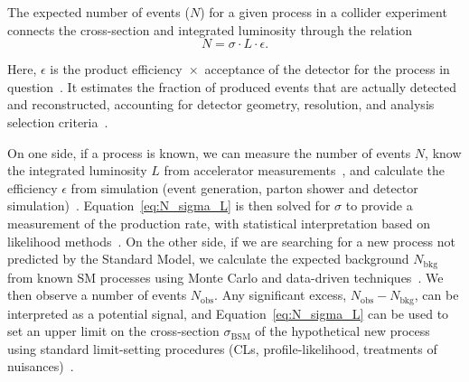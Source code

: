 The expected number of events ($N$) for a given process in a collider experiment connects the cross-section and integrated luminosity through the relation
\begin{equation}
N = \sigma \cdot L \cdot \epsilon.
\label{eq:N_sigma_L}
\end{equation}

Here, $\epsilon$ is the product efficiency~$\times$~acceptance of the detector for the process in question~\cite{CMS:PF2017,deFavereau:2013fsa}. It estimates the fraction of produced events that are actually detected and reconstructed, accounting for detector geometry, resolution, and analysis selection criteria~\cite{CMS:PF2017}.

On one side, if a process is known, we can measure the number of events $N$, know the integrated luminosity $L$ from accelerator measurements~\cite{lumiRef}, and calculate the efficiency $\epsilon$ from simulation (event generation, parton shower and detector simulation)~\cite{Alwall:2014hca,Sjostrand:2014zea,deFavereau:2013fsa}. Equation~\ref{eq:N_sigma_L} is then solved for $\sigma$ to provide a measurement of the production rate, with statistical interpretation based on likelihood methods~\cite{Cowan:2011}. On the other side, if we are searching for a new process not predicted by the Standard Model, we calculate the expected background $N_\text{bkg}$ from known SM processes using Monte Carlo and data-driven techniques~\cite{Alwall:2014hca,Cacciari:2011ma}. We then observe a number of events $N_\text{obs}$. Any significant excess, $N_\text{obs} - N_\text{bkg}$, can be interpreted as a potential signal, and Equation~\ref{eq:N_sigma_L} can be used to set an upper limit on the cross-section $\sigma_\text{BSM}$ of the hypothetical new process using standard limit-setting procedures (CLs, profile‑likelihood, treatments of nuisances)~\cite{Read:2002,Rolke:2005,FeldmanCousins:1998}.

